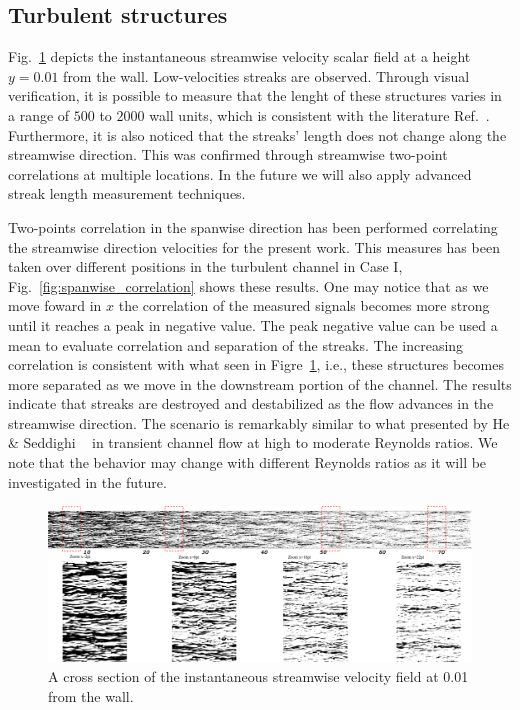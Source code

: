 \documentclass[twocolumn,10pt]{asme2e}
\begin{document}
\subsection*{Turbulent structures}

Fig.~\ref{fig:streaks} depicts the  instantaneous streamwise velocity scalar field at a height \(y=0.01\) from the wall. Low-velocities streaks are observed. Through visual verification, it is possible to measure that the lenght of these structures varies in a range of \(500\) to \(2000\) wall units, which is consistent with the literature Ref.~\cite{carlier2005}. Furthermore, it is also noticed that the streaks' length does not change along the streamwise direction. This was confirmed through streamwise two-point correlations at multiple locations. In the future we will also apply advanced streak length measurement techniques.

Two-points correlation in the spanwise direction has been performed correlating the streamwise direction velocities for the present work. This measures has been taken over different positions in the turbulent channel in Case I, Fig.~\ref{fig:spanwise_correlation} shows these results. One may notice that as we move foward in \(x\) the correlation of the measured signals becomes more strong until it reaches a peak in negative value. The peak negative value can be used a mean to evaluate correlation and separation of the streaks.  The increasing correlation is consistent with what seen  in Figre~\ref{fig:streaks}, i.e., these structures becomes more separated as we move in the downstream portion of the channel.
The results indicate that streaks are destroyed and destabilized as the flow advances  in the streamwise direction. The scenario is remarkably similar to what presented by He \& Seddighi ~\cite{he2015} in transient channel flow at high to moderate Reynolds ratios. We note that the behavior may change with different Reynolds ratios as it will be investigated in the future.

\begin{figure}[t]
	\includegraphics[width=\textwidth]{streaks.pdf}
	\caption{A cross section of the instantaneous streamwise velocity field at 0.01 from the wall.}
	\label{fig:streaks}
\end{figure}
\end{document}
